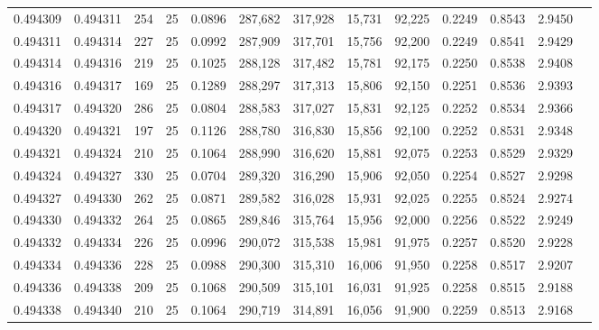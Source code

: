 \begin{tabular}{rrrrrrrrrrrrr}
0.494309 & 0.494311 &   254 &  25 &                                     0.0896 & 287,682 & 317,928 &  15,731 &  92,225 & 0.2249 & 0.8543 & 2.9450 \\
0.494311 & 0.494314 &   227 &  25 &                                     0.0992 & 287,909 & 317,701 &  15,756 &  92,200 & 0.2249 & 0.8541 & 2.9429 \\
0.494314 & 0.494316 &   219 &  25 &                                     0.1025 & 288,128 & 317,482 &  15,781 &  92,175 & 0.2250 & 0.8538 & 2.9408 \\
0.494316 & 0.494317 &   169 &  25 &                                     0.1289 & 288,297 & 317,313 &  15,806 &  92,150 & 0.2251 & 0.8536 & 2.9393 \\
0.494317 & 0.494320 &   286 &  25 &                                     0.0804 & 288,583 & 317,027 &  15,831 &  92,125 & 0.2252 & 0.8534 & 2.9366 \\
0.494320 & 0.494321 &   197 &  25 &                                     0.1126 & 288,780 & 316,830 &  15,856 &  92,100 & 0.2252 & 0.8531 & 2.9348 \\
0.494321 & 0.494324 &   210 &  25 &                                     0.1064 & 288,990 & 316,620 &  15,881 &  92,075 & 0.2253 & 0.8529 & 2.9329 \\
0.494324 & 0.494327 &   330 &  25 &                                     0.0704 & 289,320 & 316,290 &  15,906 &  92,050 & 0.2254 & 0.8527 & 2.9298 \\
0.494327 & 0.494330 &   262 &  25 &                                     0.0871 & 289,582 & 316,028 &  15,931 &  92,025 & 0.2255 & 0.8524 & 2.9274 \\
0.494330 & 0.494332 &   264 &  25 &                                     0.0865 & 289,846 & 315,764 &  15,956 &  92,000 & 0.2256 & 0.8522 & 2.9249 \\
0.494332 & 0.494334 &   226 &  25 &                                     0.0996 & 290,072 & 315,538 &  15,981 &  91,975 & 0.2257 & 0.8520 & 2.9228 \\
0.494334 & 0.494336 &   228 &  25 &                                     0.0988 & 290,300 & 315,310 &  16,006 &  91,950 & 0.2258 & 0.8517 & 2.9207 \\
0.494336 & 0.494338 &   209 &  25 &                                     0.1068 & 290,509 & 315,101 &  16,031 &  91,925 & 0.2258 & 0.8515 & 2.9188 \\
0.494338 & 0.494340 &   210 &  25 &                                     0.1064 & 290,719 & 314,891 &  16,056 &  91,900 & 0.2259 & 0.8513 & 2.9168 \\

\end{tabular}
